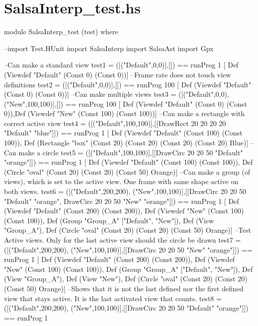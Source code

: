 \documentclass[11pt]{article}
\renewenvironment{verbatim}{}{}
\begin{document}
\section{SalsaInterp\_test.hs}
\begin{verbatim}
\begin{verbatim}
module SalsaInterp_test (test)
where

--import Test.HUnit
import SalsaInterp
import SalsaAst
import Gpx

--Can make a standard view
test1 =  ([("Default",0,0)],[])
     ==  runProg 1
    [ Def (Viewdef "Default" (Const 0) (Const 0))]
--Frame rate does not touch view definitions
test2 = ([("Default",0,0)],[]) 
     ==  runProg 100
    [ Def (Viewdef "Default" (Const 0) (Const 0))]
--Can make multiple views
test3 = ([("Default",0,0), ("New",100,100)],[]) 
     ==  runProg 100
    [ Def (Viewdef "Default" (Const 0) (Const 0)),Def (Viewdef "New" (Const 100) (Const 100))]
--Can make a rectangle with correct active view
test4 = ([("Default",100,100)],[[DrawRect 20 20 20 20 "Default" "blue"]]) 
     ==  runProg 1
    [ Def (Viewdef "Default" (Const 100) (Const 100)), Def (Rectangle "box" (Const 20) (Const 20) (Const 20) (Const 20) Blue)]
--Can make a circle
test5 = ([("Default",100,100)],[[DrawCirc 20 20 50 "Default" "orange"]]) 
     ==  runProg 1
    [ Def (Viewdef "Default" (Const 100) (Const 100)), Def (Circle "oval" (Const 20) (Const 20) (Const 50) Orange)]
--Can make a group (of views), which is set to the active view. One frame with same shape active on both views.
test6 = ([("Default",200,200), ("New",100,100)],[[DrawCirc 20 20 50 "Default" "orange", DrawCirc 20 20 50 "New" "orange"]]) 
     ==  runProg 1
    [ Def (Viewdef "Default" (Const 200) (Const 200)), Def (Viewdef "New" (Const 100) (Const 100)), Def (Group "Group_A" ["Default", "New"]), Def (View "Group_A"), Def (Circle "oval" (Const 20) (Const 20) (Const 50) Orange)]
--Test Active views. Only for the last active view should the circle be drawn
test7 = ([("Default",200,200), ("New",100,100)],[[DrawCirc 20 20 50 "New" "orange"]]) 
     ==  runProg 1
    [ Def (Viewdef "Default" (Const 200) (Const 200)), Def (Viewdef "New" (Const 100) (Const 100)), Def (Group "Group_A" ["Default", "New"]), Def (View "Group_A"), Def (View "New"), Def (Circle "oval" (Const 20) (Const 20) (Const 50) Orange)]
--Shows that it is not the last defined nor the first defined view that stays active. It is the last activated view that counts.
test8 = ([("Default",200,200), ("New",100,100)],[[DrawCirc 20 20 50 "Default" "orange"]]) 
     ==  runProg 1

\end{verbatim}
\end{document}
